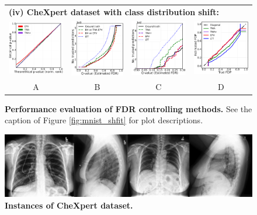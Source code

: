 \documentclass{article}
\begin{document}
\begin{figure}[h!]
\begin{tabular}{cccc}
		\multicolumn{4}{l}{\bf (iv) CheXpert dataset with class distribution shift:}\\	
		\includegraphics[width=0.225\linewidth, height=0.225\linewidth]{img/cnn_QQ_chx_balanced.png} 		&
		\includegraphics[width=0.225\linewidth, height=0.225\linewidth]{img/cnn_chx_balanced_fdr_control.png} & 
		\includegraphics[width=0.225\linewidth, height=0.225\linewidth]{img/cnn_chx_balanced_fdr_control_loc.png} & 
		\includegraphics[width=0.225\linewidth, height=0.225\linewidth]{img/cnn_FDPscat_chx_balanced.png}\\
		A & B & C & D
	\end{tabular}
	\caption{{\bf Performance evaluation of FDR controlling methods.} See the caption of Figure \ref{fig:mnist_shfit} for plot descriptions. }
	\label{fig:I}
\end{figure} 

\begin{figure}[h!]
	\centering
	\includegraphics[width=5.in]{img/chx.png}
	\caption{{\bf Instances of CheXpert dataset.}}
	\label{fig:pcam_example}
\end{figure} 
\end{document}
